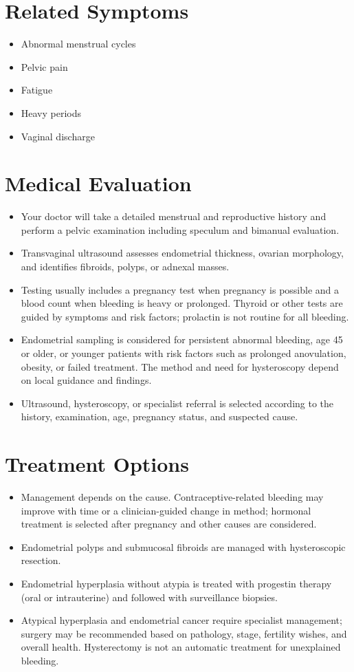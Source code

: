 \section*{Related Symptoms}
\begin{itemize}
 \item Abnormal menstrual cycles
 \item Pelvic pain
 \item Fatigue
 \item Heavy periods
 \item Vaginal discharge
\end{itemize}

\section*{Medical Evaluation}
\begin{itemize}
 \item Your doctor will take a detailed menstrual and reproductive history and perform a pelvic examination including speculum and bimanual evaluation.
 \item Transvaginal ultrasound assesses endometrial thickness, ovarian morphology, and identifies fibroids, polyps, or adnexal masses.
 \item Testing usually includes a pregnancy test when pregnancy is possible and a blood count when bleeding is heavy or prolonged. Thyroid or other tests are guided by symptoms and risk factors; prolactin is not routine for all bleeding.
 \item Endometrial sampling is considered for persistent abnormal bleeding, age 45 or older, or younger patients with risk factors such as prolonged anovulation, obesity, or failed treatment. The method and need for hysteroscopy depend on local guidance and findings.
 \item Ultrasound, hysteroscopy, or specialist referral is selected according to the history, examination, age, pregnancy status, and suspected cause.
\end{itemize}

\section*{Treatment Options}
\begin{itemize}
 \item Management depends on the cause. Contraceptive-related bleeding may improve with time or a clinician-guided change in method; hormonal treatment is selected after pregnancy and other causes are considered.
 \item Endometrial polyps and submucosal fibroids are managed with hysteroscopic resection.
 \item Endometrial hyperplasia without atypia is treated with progestin therapy (oral or intrauterine) and followed with surveillance biopsies.
 \item Atypical hyperplasia and endometrial cancer require specialist management; surgery may be recommended based on pathology, stage, fertility wishes, and overall health. Hysterectomy is not an automatic treatment for unexplained bleeding.
\end{itemize}

